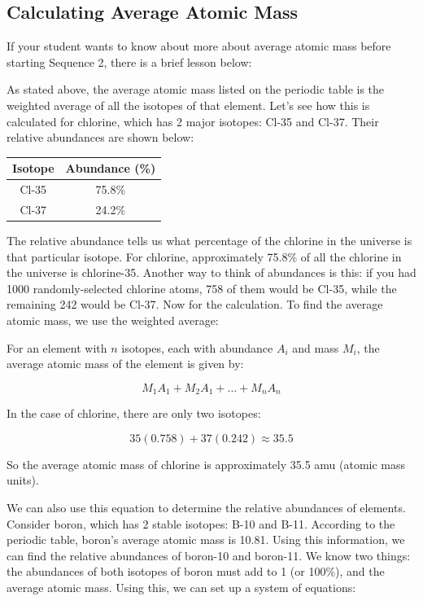 \subsection{Calculating Average Atomic Mass}
If your student wants to know about more about average atomic mass before starting Sequence 2, there is a brief lesson below:

As stated above, the average atomic mass listed on the periodic table is the 
weighted average of all the isotopes of that element. Let's see how this is 
calculated for chlorine, which has 2 major isotopes: Cl-35 and Cl-37. Their 
relative abundances are shown below:

\begin{center}
\begin{tabular}{|c|c|}
\hline
Isotope & Abundance (\%)\\
\hline
Cl-35 & 75.8\%\\
\hline
Cl-37 & 24.2\%\\
\hline 
\end{tabular}
\end{center}

The relative abundance tells us what percentage of the chlorine in the universe 
is that particular isotope. For chlorine, approximately 75.8\% of all the 
chlorine in the universe is chlorine-35. Another way to think of abundances is 
this: if you had 1000 randomly-selected chlorine atoms, 758 of them would be 
Cl-35, while the remaining 242 would be Cl-37. Now for the calculation. To 
find the average atomic mass, we use the weighted average:

\begin{mdframed}[style = important, frametitle = {Calculating Average Atomic Mass}]
For an element with $n$ isotopes, each with abundance $A_i$ and mass $M_i$, the 
average atomic mass of the element is given by:

$$M_1 A_1 + M_2 A_1 + \dots +M_n A_n$$
\end{mdframed}

In the case of chlorine, there are only two isotopes:

$$35 \left(0.758\right) + 37 \left(0.242 \right) \approx 35.5$$

So the average atomic mass of chlorine is approximately 35.5 amu (atomic mass 
units). 

We can also use this equation to determine the relative abundances of elements. 
Consider boron, which has 2 stable isotopes: B-10 and B-11. According to the 
periodic table, boron's average atomic mass is 10.81. Using this information, 
we can find the relative abundances of boron-10 and boron-11. We know two 
things: the abundances of both isotopes of boron must add to 1 (or 100\%), and 
the average atomic mass. Using this, we can set up a system of equations:

